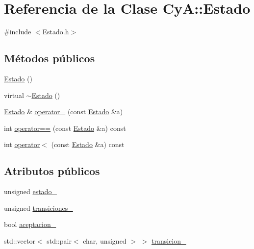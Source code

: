 \hypertarget{class_cy_a_1_1_estado}{}\section{Referencia de la Clase CyA\+:\+:Estado}
\label{class_cy_a_1_1_estado}


{\ttfamily \#include $<$Estado.\+h$>$}

\subsection*{Métodos públicos}
\begin{DoxyCompactItemize}
\item 
\mbox{\hyperlink{class_cy_a_1_1_estado_a3f2fc56adbfa985981d70e6b6f7a175a}{Estado}} ()
\item 
virtual \mbox{\hyperlink{class_cy_a_1_1_estado_af9482bdfe735f4862e444c4e63b81c84}{$\sim$\+Estado}} ()
\item 
\mbox{\hyperlink{class_cy_a_1_1_estado}{Estado}} \& \mbox{\hyperlink{class_cy_a_1_1_estado_a32736601fb07796167fdc0b6821d2508}{operator=}} (const \mbox{\hyperlink{class_cy_a_1_1_estado}{Estado}} \&a)
\item 
int \mbox{\hyperlink{class_cy_a_1_1_estado_a35f9d60de08befa830c44f2b3e1fd3bc}{operator==}} (const \mbox{\hyperlink{class_cy_a_1_1_estado}{Estado}} \&a) const
\item 
int \mbox{\hyperlink{class_cy_a_1_1_estado_a7ada3a4e88d3c27d66592eef790fdf46}{operator$<$}} (const \mbox{\hyperlink{class_cy_a_1_1_estado}{Estado}} \&a) const
\end{DoxyCompactItemize}
\subsection*{Atributos públicos}
\begin{DoxyCompactItemize}
\item 
unsigned \mbox{\hyperlink{class_cy_a_1_1_estado_a302d42b269605feb9ab837d4c952d871}{estado\+\_\+}}
\item 
unsigned \mbox{\hyperlink{class_cy_a_1_1_estado_ae74acdff6c33550ac3235295d5070b91}{transiciones\+\_\+}}
\item 
bool \mbox{\hyperlink{class_cy_a_1_1_estado_a7952d333fb3611d3abcf605d8ed0177a}{aceptacion\+\_\+}}
\item 
std\+::vector$<$ std\+::pair$<$ char, unsigned $>$ $>$ \mbox{\hyperlink{class_cy_a_1_1_estado_a8eea41e8dba3f84a191d3a4a6a120006}{transicion\+\_\+}}
\end{DoxyCompactItemize}


